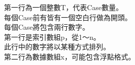 第一行為一個整數T，代表Case數量。\\
每個Case前有皆有一個空白行做為開頭。\\
每個Case將包含兩行數字。\\
第一行是索引數組p，從1～n。\\
此行中的數字將以某種方式排列。\\
第二行為數據數組x，可能包含浮點格式。\\
